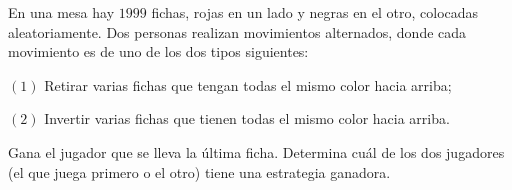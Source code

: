 En una mesa hay $1999$ fichas, rojas en un lado y negras en el otro, colocadas aleatoriamente. Dos personas realizan movimientos alternados, donde cada movimiento es de uno de los dos tipos siguientes:

$(1)$ Retirar varias fichas que tengan todas el mismo color hacia arriba;

$(2)$ Invertir varias fichas que tienen todas el mismo color hacia arriba.

Gana el jugador que se lleva la última ficha. Determina cuál de los dos jugadores (el que juega primero o el otro) tiene una estrategia ganadora.